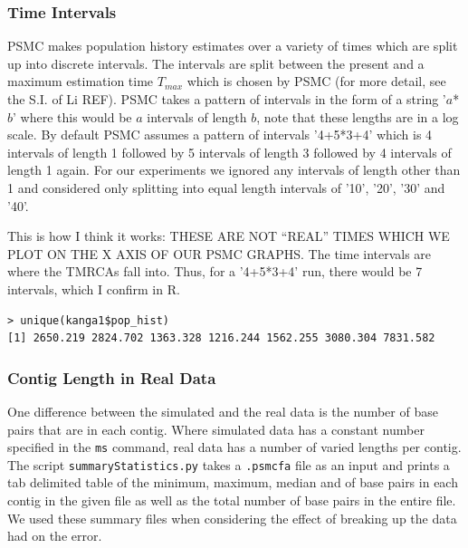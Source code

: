 \documentclass[11pt,a4paper]{article}
\begin{document}
\subsubsection{Time Intervals}
PSMC makes population history estimates over a variety of times which are split up into discrete intervals. The intervals are split between the present and a maximum estimation time $T_{max}$ which is chosen by PSMC (for more detail, see the S.I. of Li REF). PSMC takes a pattern of intervals in the form of a string '$a$*$b$' where this would be $a$ intervals of length $b$, note that these lengths are in a log scale. By default PSMC assumes a pattern of intervals '4+5*3+4' which is 4 intervals of length 1 followed by 5 intervals of length 3 followed by 4 intervals of length 1 again. For our experiments we ignored any intervals of length other than 1 and considered only splitting into equal length intervals of '10', '20', '30' and '40'.

This is how I think it works: THESE ARE NOT ``REAL'' TIMES WHICH WE PLOT ON THE X AXIS OF OUR PSMC GRAPHS. The time intervals are where the TMRCAs fall into. Thus, for a '4+5*3+4' run, there would be 7 intervals, which I confirm in R.
\begin{lstlisting}
> unique(kanga1$pop_hist)
[1] 2650.219 2824.702 1363.328 1216.244 1562.255 3080.304 7831.582
\end{lstlisting}


\subsubsection{Contig Length in Real Data}\label{contigLength}
One difference between the simulated and the real data is the number of base pairs that are in each contig. Where simulated data has a constant number specified in the \verb|ms| command, real data has a number of varied lengths per contig. The script \verb|summaryStatistics.py| takes a \verb|.psmcfa| file as an input and prints a tab delimited table of the minimum, maximum, median and of base pairs in each contig in the given file as well as the total number of base pairs in the entire file. We used these summary files when considering the effect of breaking up the data had on the error.
\end{document}
